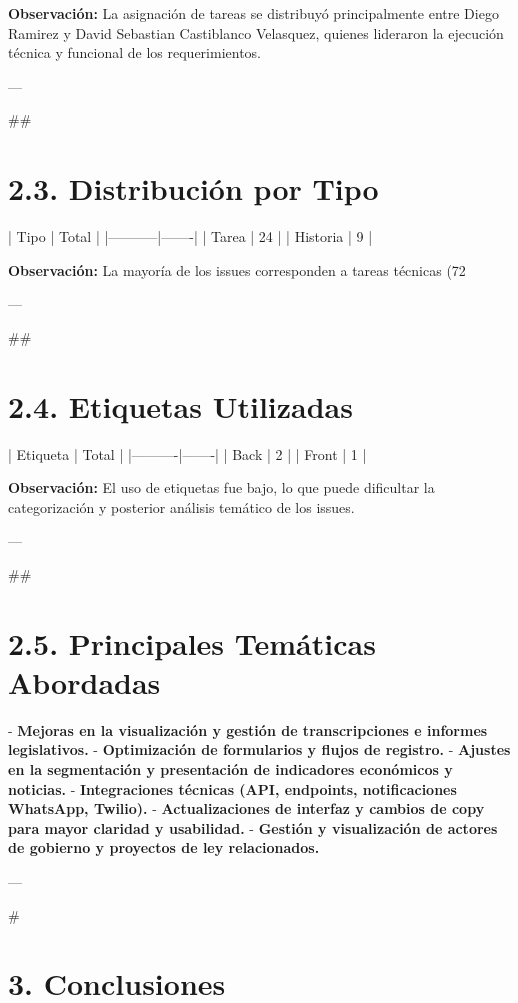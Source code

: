 \documentclass{article}
\begin{document}
\textbf{Observación:}  
La asignación de tareas se distribuyó principalmente entre Diego Ramirez y David Sebastian Castiblanco Velasquez, quienes lideraron la ejecución técnica y funcional de los requerimientos.

---

##\section{2.3. Distribución por Tipo}

| Tipo      | Total |
|-----------|-------|
| Tarea     | 24    |
| Historia  | 9     |

\textbf{Observación:}  
La mayoría de los issues corresponden a tareas técnicas (72%

---

##\section{2.4. Etiquetas Utilizadas}

| Etiqueta | Total |
|----------|-------|
| Back     | 2     |
| Front    | 1     |

\textbf{Observación:}  
El uso de etiquetas fue bajo, lo que puede dificultar la categorización y posterior análisis temático de los issues.

---

##\section{2.5. Principales Temáticas Abordadas}

- \textbf{Mejoras en la visualización y gestión de transcripciones e informes legislativos.}
- \textbf{Optimización de formularios y flujos de registro.}
- \textbf{Ajustes en la segmentación y presentación de indicadores económicos y noticias.}
- \textbf{Integraciones técnicas (API, endpoints, notificaciones WhatsApp, Twilio).}
- \textbf{Actualizaciones de interfaz y cambios de copy para mayor claridad y usabilidad.}
- \textbf{Gestión y visualización de actores de gobierno y proyectos de ley relacionados.}

---

#\section{3. Conclusiones}
\end{document}
